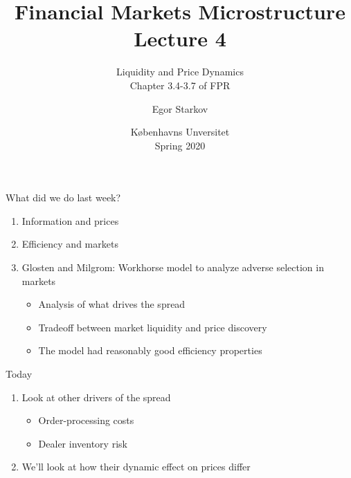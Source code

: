 \documentclass[english,10pt
,aspectratio=169
]{beamer}
\title{Financial Markets Microstructure \\ Lecture 4}
\subtitle{Liquidity and Price Dynamics\\
Chapter 3.4-3.7 of FPR}
\author{Egor Starkov}
\date{K{\o}benhavns Unversitet \\
	Spring 2020}
\begin{document}
	

\frame[plain]{\titlepage}



\begin{frame}{What did we do last week?}
\begin{enumerate}
	\item Information and prices
	\item Efficiency and markets
	\item Glosten and Milgrom: Workhorse model to analyze adverse selection in markets
	\begin{itemize}
	\item Analysis of what drives the spread
	\item Tradeoff between market liquidity and price discovery
	\item The model had reasonably good efficiency properties
	\end{itemize}
\end{enumerate}
\end{frame}




\begin{frame}{Today}
\begin{enumerate}
	\item Look at other drivers of the spread
	\begin{itemize}
		\item Order-processing costs
		\item Dealer inventory risk
	\end{itemize}
	\item We'll look at how their dynamic effect on prices differ
\end{enumerate}
\end{frame}
\end{document}

